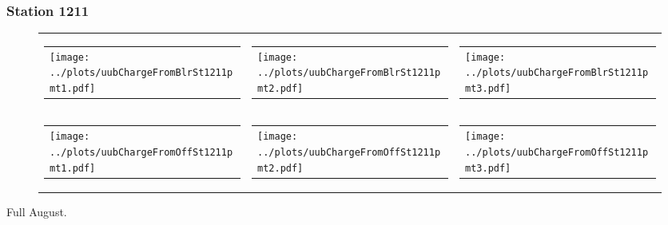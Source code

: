 \documentclass[aspectratio=169]{beamer}
\begin{document}
\begin{frame} 
  \frametitle{Station 1211}
 
  \begin{figure}
    \centering
    \begin{tabularx}{\textwidth}{LCR}
      \begin{tabular}{l}
        \texttt{[image: ../plots/uubChargeFromBlrSt1211pmt1.pdf]}
      \end{tabular}
      &
      \begin{tabular}{l}
        \texttt{[image: ../plots/uubChargeFromBlrSt1211pmt2.pdf]}
      \end{tabular}
      &
      \begin{tabular}{l}
        \texttt{[image: ../plots/uubChargeFromBlrSt1211pmt3.pdf]}
      \end{tabular}
      \\
      \begin{tabular}{l}
        \texttt{[image: ../plots/uubChargeFromOffSt1211pmt1.pdf]}
      \end{tabular}
      &
      \begin{tabular}{l}
        \texttt{[image: ../plots/uubChargeFromOffSt1211pmt2.pdf]}
      \end{tabular}
      &
      \begin{tabular}{l}
        \texttt{[image: ../plots/uubChargeFromOffSt1211pmt3.pdf]}
      \end{tabular}
    \end{tabularx}
  \end{figure}
  Full August. 
\end{frame}
\end{document}

